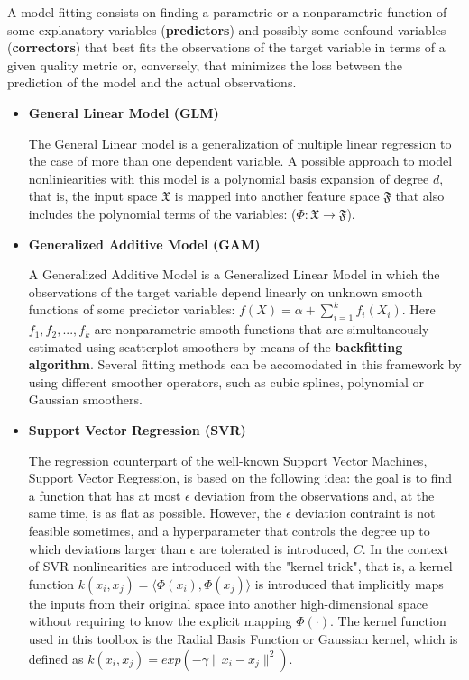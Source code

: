 \documentclass{article}
\begin{document}
A model fitting consists on finding a parametric or a nonparametric function of some explanatory variables (\textbf{predictors}) and possibly some confound variables (\textbf{correctors}) that best fits the observations of the target variable in terms of a given quality metric or, conversely, that minimizes the loss between the prediction of the model and the actual observations.
\begin{itemize}
\item \textbf{General Linear Model (GLM)} 

The General Linear model is a generalization of multiple linear regression to the case of more than one dependent variable. 
A possible approach to model nonliniearities with this model is a polynomial basis expansion of degree $d$, that is, the input space $\mathfrak{X}$ is mapped into another feature space $\mathfrak{F}$ that also includes the polynomial terms of the variables: ($\Phi : \mathfrak{X} \rightarrow \mathfrak{F}$).

\item \textbf{Generalized Additive Model (GAM)} 

A Generalized Additive Model is a Generalized Linear Model in which the observations of the target variable depend linearly on unknown smooth functions of some predictor variables: $ f(X) = \alpha + \sum_{i=1}^{k} f_i(X_i)$. Here $f_1, f_2, ..., f_k$ are nonparametric smooth functions that are simultaneously estimated using scatterplot smoothers by means of the \textbf{backfitting algorithm}. Several fitting methods can be accomodated in this framework by using different smoother operators, such as cubic splines, polynomial or Gaussian smoothers. 

\item \textbf{Support Vector Regression (SVR)} 

The regression counterpart of the well-known Support Vector Machines, Support Vector Regression, is based on the following idea: the goal is to find a function that has at most $\epsilon$ deviation from the observations and, at the same time, is as flat as possible. However, the $\epsilon$ deviation contraint is not feasible sometimes, and a hyperparameter that controls the degree up to which deviations larger than $\epsilon$ are tolerated is introduced, $C$. 
In the context of SVR nonlinearities are introduced with the "kernel trick", that is, a kernel function $ k(x_i, x_j) = \langle \Phi(x_i), \Phi(x_j) \rangle $ is introduced that implicitly maps the inputs from their original space into another high-dimensional space without requiring to know the explicit mapping $ \Phi(\cdot) $. 
The kernel function used in this toolbox is the Radial Basis Function or Gaussian kernel, which is defined as $ k(x_i, x_j) = exp(-\gamma \|x_i - x_j\|^2)$.
\end{itemize}
\end{document}
